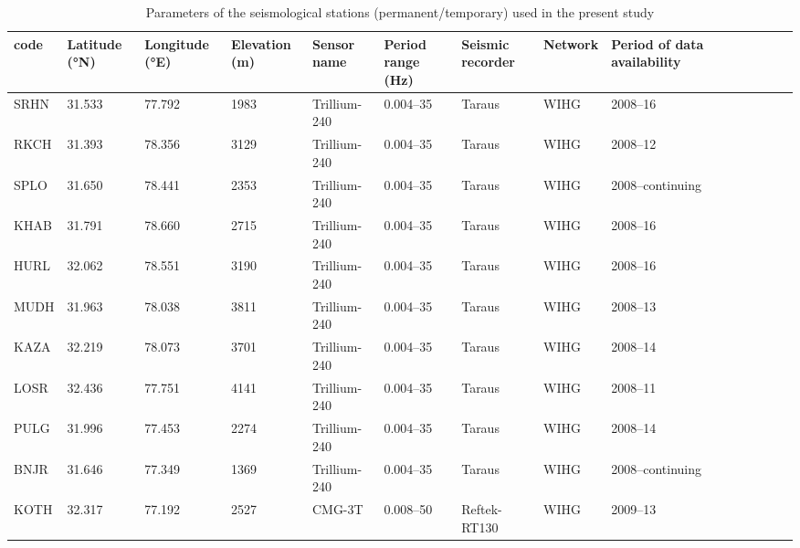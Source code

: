 \begin{table}[]

\caption{Parameters of the seismological stations (permanent/temporary) used in the present study}
\label{tab: 4.1}
\resizebox{16cm}{8cm}
{
\begin{tabular}{lp{1cm}lp{2cm}lp{2cm}lp{2cm}llp{2cm}lp{2cm}ll}
\hline
code & Latitude (°N) & Longitude (°E) & Elevation (m) & Sensor name  & Period range (Hz) & Seismic recorder & Network & Period of data availability \\ \hline
SRHN & 31.533        & 77.792         & 1983          & Trillium-240 & 0.004–35          & Taraus           & WIHG    & 2008–16                     \\
RKCH & 31.393        & 78.356         & 3129          & Trillium-240 & 0.004–35          & Taraus           & WIHG    & 2008–12                     \\
SPLO & 31.650        & 78.441         & 2353          & Trillium-240 & 0.004–35          & Taraus           & WIHG    & 2008–continuing             \\
KHAB & 31.791        & 78.660         & 2715          & Trillium-240 & 0.004–35          & Taraus           & WIHG    & 2008–16                     \\
HURL & 32.062        & 78.551         & 3190          & Trillium-240 & 0.004–35          & Taraus           & WIHG    & 2008–16                     \\
MUDH & 31.963        & 78.038         & 3811          & Trillium-240 & 0.004–35          & Taraus           & WIHG    & 2008–13                     \\
KAZA & 32.219        & 78.073         & 3701          & Trillium-240 & 0.004–35          & Taraus           & WIHG    & 2008–14                     \\
LOSR & 32.436        & 77.751         & 4141          & Trillium-240 & 0.004–35          & Taraus           & WIHG    & 2008–11                     \\
PULG & 31.996        & 77.453         & 2274          & Trillium-240 & 0.004–35          & Taraus           & WIHG    & 2008–14                     \\
BNJR & 31.646        & 77.349         & 1369          & Trillium-240 & 0.004–35          & Taraus           & WIHG    & 2008–continuing             \\
KOTH & 32.317        & 77.192         & 2527          & CMG-3T       & 0.008–50          & Reftek-RT130     & WIHG    & 2009–13                     \\

\end{tabular}}
\end{table}
